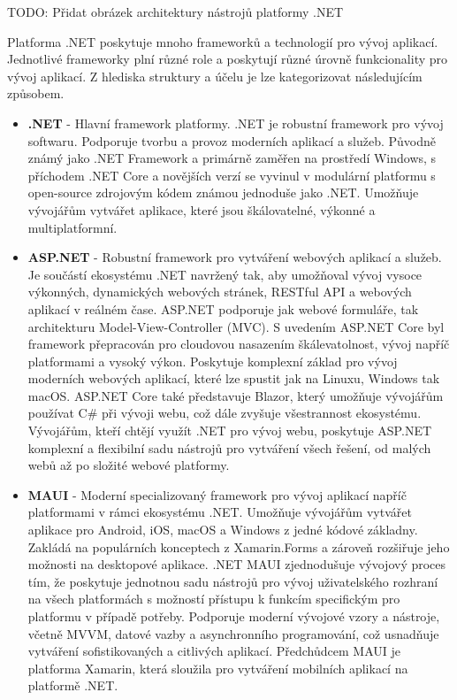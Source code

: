 TODO: Přidat obrázek architektury nástrojů platformy .NET


Platforma .NET poskytuje mnoho frameworků a technologií pro vývoj aplikací. Jednotlivé frameworky plní různé role a poskytují různé úrovně funkcionality pro vývoj aplikací. Z hlediska struktury a účelu je lze kategorizovat následujícím způsobem.

\begin{itemize}
    \item \textbf{.NET} - Hlavní framework platformy. .NET je robustní framework pro vývoj softwaru. Podporuje tvorbu a provoz moderních aplikací a služeb. Původně známý jako .NET Framework a primárně zaměřen na prostředí Windows, s příchodem .NET Core a novějších verzí se vyvinul v modulární platformu s open-source zdrojovým kódem známou jednoduše jako .NET. Umožňuje vývojářům vytvářet aplikace, které jsou škálovatelné, výkonné a multiplatformní.
    \item \textbf{ASP.NET} - Robustní framework pro vytváření webových aplikací a služeb. Je součástí ekosystému .NET navržený tak, aby umožňoval vývoj vysoce výkonných, dynamických webových stránek, RESTful API a webových aplikací v reálném čase. ASP.NET podporuje jak webové formuláře, tak architekturu Model-View-Controller (MVC). S uvedením ASP.NET Core byl framework přepracován pro cloudovou nasazením škálevatolnost, vývoj napříč platformami a vysoký výkon. Poskytuje komplexní základ pro vývoj moderních webových aplikací, které lze spustit jak na Linuxu, Windows tak macOS. ASP.NET Core také představuje Blazor, který umožňuje vývojářům používat C\# při vývoji webu, což dále zvyšuje všestrannost ekosystému. Vývojářům, kteří chtějí využít .NET pro vývoj webu, poskytuje ASP.NET komplexní a flexibilní sadu nástrojů pro vytváření všech řešení, od malých webů až po složité webové platformy.
    \item \textbf{MAUI} - Moderní specializovaný framework pro vývoj aplikací napříč platformami v rámci ekosystému .NET. Umožňuje vývojářům vytvářet aplikace pro Android, iOS, macOS a Windows z jedné kódové základny. Zakládá na populárních konceptech z Xamarin.Forms a zároveň rozšiřuje jeho možnosti na desktopové aplikace. .NET MAUI zjednodušuje vývojový proces tím, že poskytuje jednotnou sadu nástrojů pro vývoj uživatelského rozhraní na všech platformách s možností přístupu k funkcím specifickým pro platformu v případě potřeby. Podporuje moderní vývojové vzory a nástroje, včetně MVVM, datové vazby a asynchronního programování, což usnadňuje vytváření sofistikovaných a citlivých aplikací. Předchůdcem MAUI je platforma Xamarin, která sloužila pro vytváření mobilních aplikací na platformě .NET.

\end{itemize}
